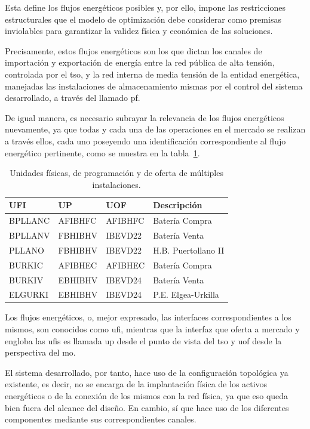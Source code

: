 Esta define los flujos energéticos posibles y, por ello, impone las restricciones estructurales que el modelo de optimización debe considerar como premisas inviolables para garantizar la validez física y económica de las soluciones.

Precisamente, estos flujos energéticos son los que dictan los canales de importación y exportación de energía entre la red pública de alta tensión, controlada por el \gls{tso}, y la red interna de media tensión de la entidad energética, manejadas las instalaciones de almacenamiento mismas por el control del sistema desarrollado, a través del llamado \gls{pf}.

De igual manera, es necesario subrayar la relevancia de los flujos energéticos nuevamente, ya que todas y cada una de las operaciones en el mercado se realizan a través ellos, cada uno poseyendo una identificación correspondiente al flujo energético pertinente, como se muestra en la tabla~\ref{tab:unidades-fisicas}.

\begin{table}[ht]
  \centering
  \begin{tabular}{|l|l|l|l|}
    \hline
    UFI     & UP      & UOF     & Descripción         \\
    \hline
    BPLLANC & AFIBHFC & AFIBHFC & Batería Compra      \\
    BPLLANV & FBHIBHV & IBEVD22 & Batería Venta       \\
    PLLANO  & FBHIBHV & IBEVD22 & H.B. Puertollano II \\
    BURKIC  & AFIBHEC & AFIBHEC & Batería Compra      \\
    BURKIV  & EBHIBHV & IBEVD24 & Batería Venta       \\
    ELGURKI & EBHIBHV & IBEVD24 & P.E. Elgea-Urkilla  \\
    \hline
  \end{tabular}
  \caption{Unidades físicas, de programación y de oferta de múltiples instalaciones.}
  \label{tab:unidades-fisicas}
\end{table}

Los flujos energéticos, o, mejor expresado, las interfaces correspondientes a los mismos, son conocidos como \gls{ufi}, mientras que la interfaz que oferta a mercado y engloba las \glspl{ufi} es llamada \gls{up} desde el punto de vista del \gls{tso} y \gls{uof} desde la perspectiva del \gls{mo}.

El sistema desarrollado, por tanto, hace uso de la configuración topológica ya existente, es decir, no se encarga de la implantación física de los activos energéticos o de la conexión de los mismos con la red física, ya que eso queda bien fuera del alcance del diseño. En cambio, sí que hace uso de los diferentes componentes mediante sus correspondientes canales.


